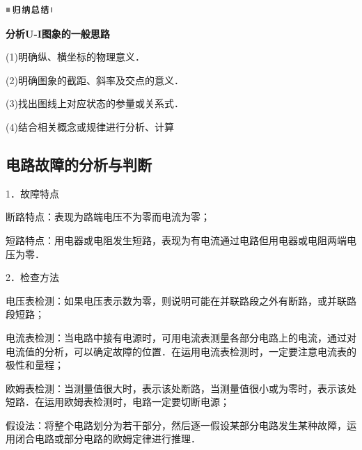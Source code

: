 \begin{center}\includegraphics[width=0.70764in,height=0.12292in]{media/image13.png}\end{center}
\begin{center}
	\textbf{分析U-I图象的一般思路}
\end{center}


(1)明确纵、横坐标的物理意义．

(2)明确图象的截距、斜率及交点的意义．

(3)找出图线上对应状态的参量或关系式．

(4)结合相关概念或规律进行分析、计算


\subsection{电路故障的分析与判断}

1．故障特点

断路特点：表现为路端电压不为零而电流为零；

短路特点：用电器或电阻发生短路，表现为有电流通过电路但用电器或电阻两端电压为零．

2．检查方法

电压表检测：如果电压表示数为零，则说明可能在并联路段之外有断路，或并联路段短路；

电流表检测：当电路中接有电源时，可用电流表测量各部分电路上的电流，通过对电流值的分析，可以确定故障的位置．在运用电流表检测时，一定要注意电流表的极性和量程；

欧姆表检测：当测量值很大时，表示该处断路，当测量值很小或为零时，表示该处短路．在运用欧姆表检测时，电路一定要切断电源；

假设法：将整个电路划分为若干部分，然后逐一假设某部分电路发生某种故障，运用闭合电路或部分电路的欧姆定律进行推理．


